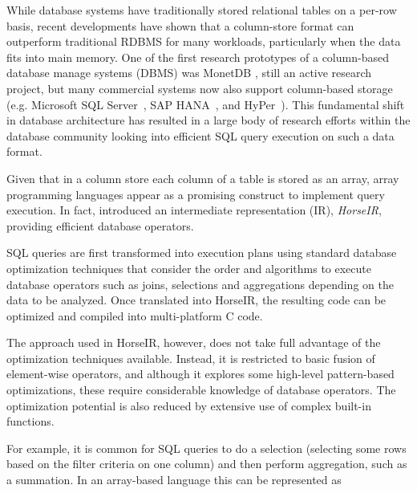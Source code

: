 While database systems have traditionally stored relational tables on a per-row
basis, recent developments have shown that a column-store format can outperform
traditional RDBMS for many workloads, particularly when the data fits into
main memory.
One of the first research prototypes of a column-based database manage systems
(DBMS) was MonetDB \cite{IdreosS2012}, still an active research project, but
many commercial systems now also support column-based storage (e.g.
Microsoft SQL Server~\cite{msqlserver},
SAP HANA~\cite{FarberF2012}, and
HyPer~\cite{Neumann2011:HyPer}).
This fundamental shift in database architecture has resulted in a large body of
research efforts within the database community looking into efficient SQL query
execution on such a data format.

Given that in a column store each column of a table is stored as an array,
array programming languages appear as a promising construct to implement query
execution. In fact, \OldPaperAuthor introduced an intermediate representation (IR),
\textit{HorseIR}, providing efficient database operators.

SQL queries are first transformed into execution plans using standard database
optimization techniques that consider the order and algorithms to execute database
operators such as joins, selections and aggregations depending on the
data to be analyzed. Once translated into HorseIR, the resulting code can be
optimized and compiled into multi-platform C code.

The approach used in HorseIR, however, does not take full advantage of the
optimization techniques available. Instead, it is restricted to basic
fusion of element-wise operators, and although it explores some high-level
pattern-based optimizations, these require considerable knowledge of
database operators.  The optimization potential is also reduced by extensive use of
complex built-in functions.

For example, it is common for SQL queries to do a selection (selecting some
rows based on the filter criteria on one column) and then perform aggregation,
such as a summation.  In an array-based language this can be represented as

